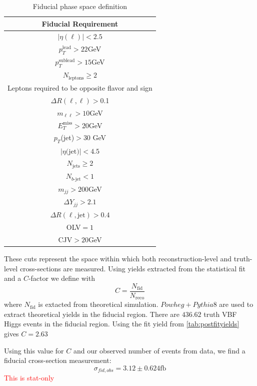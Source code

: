 \begin{table}[!ht]
\centering
\begin{tabular}{|c|}
\hline
Fiducial Requirement \\
\hline
$|\eta(\ell)|<2.5$ \\
$p_T^{\text{lead}}>22$GeV \\
$p_T^{\text{sublead}}>15$GeV \\
$N_{\text{leptons}}\geq2$ \\
Leptons required to be opposite flavor and sign \\
$\Delta R(\ell,\ell) >$0.1 \\
$m_{\ell\ell}>10$GeV \\
$E_T^{\text{miss}}>$20GeV \\
$p_T$(jet)$>$30 GeV \\
$|\eta\text{(jet)}|<4.5$ \\ 
$N_{\text{jets}} \geq 2$ \\
$N_{b\text{-jet}} < 1$ \\
$m_{jj} >200$GeV \\
$\Delta Y_{jj}>2.1$ \\
$\Delta R(\ell,\text{jet})>0.4$ \\
OLV$=1$ \\
CJV$>20$GeV \\
\hline
\end{tabular}
\caption{Fiducial phase space definition}
\label{tab:fiducial}
\end{table}
These cuts represent the space within which both reconstruction-level and truth-level cross-sections are measured. Using yields extracted from the statistical fit and a $C$-factor we define with 
\begin{equation}
C = \frac{N_\text{fid}}{N_{\text{reco}}}
\end{equation}
where $N_\text{fid}$ is extacted from theoretical simulation. $Powheg+Pythia8$ are used to extract theoretical yields in the fiducial region. There are $436.62$ truth VBF Higgs events in the fiducial region. Using the fit yield from \ref{tab:postfityields} gives $C=2.63$

Using this value for $C$ and our observed number of events from data, we find a fiducial cross-section measurement:
\begin{equation}
\sigma_{fid,obs} = 3.12 \pm 0.624 \text{fb} 
\end{equation}
\textcolor{red}{This is stat-only}

